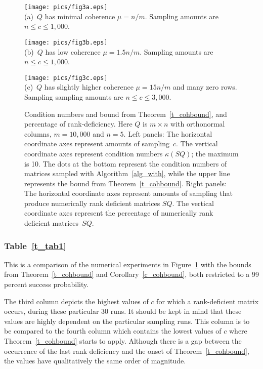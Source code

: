 \documentclass{siamltex}
\begin{document}
\begin{figure}  
\begin{center}
\resizebox{4in}{!}
{\texttt{[image: pics/fig3a.eps]}}\\
{{{\footnotesize{{(a)\ $Q$ has minimal coherence $\mu = n/m$. Sampling amounts
are $n\leq c\leq 1,000$.}}}}}
\end{center}
\begin{center}
\resizebox{4in}{!}
{\texttt{[image: pics/fig3b.eps]}}\\
{{{\footnotesize{{(b)\ $Q$ has low coherence $\mu = 1.5 n/m$. Sampling amounts
are $n\leq c\leq 1,000$.}}}}}
\end{center}
\begin{center}
\resizebox{4in}{!}
{\texttt{[image: pics/fig3c.eps]}}\\
{{{\footnotesize{{(c)\ $Q$ has slightly higher coherence $\mu = 15n/m$ and many zero 
rows. Sampling sampling amounts are $n\leq c\leq 3,000$.}}}}}
\end{center}
\caption{Condition numbers and bound from Theorem~\ref{t_cohbound},
and percentage of rank-deficiency.
Here $Q$ is $m\times n$ with orthonormal 
columns, $m=10,000$ and $n=5$.
Left panels: The horizontal coordinate axes represent amounts of sampling~$c$. 
The vertical coordinate axes represent
condition numbers $\kappa(SQ)$; the maximum is 10.
The dots at the bottom represent the
condition numbers of matrices sampled with Algorithm~\ref{alg_with}, 
while the upper line
represents the bound from Theorem~\ref{t_cohbound}.
Right panels: The horizontal coordinate axes represent amounts of sampling that
produce numerically rank deficient matrices $SQ$.  
The vertical coordinate axes represent the percentage of
numerically rank deficient matrices~$SQ$.
}\label{f_fig3}
\end{figure}

\subsubsection*{Table~\ref{t_tab1}}
This is a comparison of the numerical experiments in Figure~\ref{f_fig3}
with the bounds from Theorem~\ref{t_cohbound} and 
Corollary~\ref{c_cohbound}, both restricted to a 99 percent success
probability.

The third column depicts the highest values of $c$ for which
a rank-deficient matrix occurs, during these particular 30 runs. 
It should be kept in mind that these values are highly dependent on
the particular sampling runs. This column is to be compared 
to the fourth column which contains the lowest values of $c$ where
Theorem~\ref{t_cohbound} starts to apply.
Although there is a gap between the occurrence of the last rank deficiency
and the onset of Theorem~\ref{t_cohbound}, the values have qualitatively
the same order of magnitude.
\end{document}
